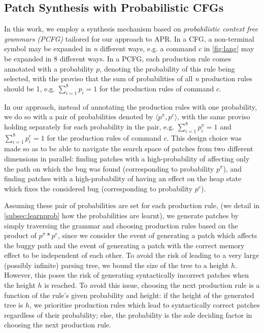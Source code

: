 \subsection{Patch Synthesis with Probabilistic CFGs}
In this work, we employ a synthesis mechanism based on \emph{probabilistic context free grammars (PCFG)} tailored for our approach to APR.
%
In a CFG, a non-terminal symbol may be expanded in \emph{n} different ways,  
e.g. a command $c$ in \autoref{fig:lang} may be expanded in 8 different ways.
In a PCFG, each production rule comes annotated with a probability $p$, denoting the probability of this rule being selected, with the proviso that 
the sum of probabilities of all  \emph{n} production rules should be 1, e.g. 
$\sum_{i=1}^8 p_i =1$ for the production rules of command $c$.

In our approach, instead of annotating the production rules with one probability, 
we do so with a pair of probabilities denoted by  $\langle p^\pi, p^e \rangle$, with the same proviso holding 
separately for each probability in the pair, e.g. $\sum_{i=1}^8 p^\pi_i =1$ and  $\sum_{i=1}^8 p^e_i =1$ for the production rules of command $c$.
This design choice was made so as to be able to navigate the search space of patches from two different dimensions in parallel: 
finding patches with a high-probability of affecting only the path on which the bug was found (corresponding to probability $p^\pi$), 
and finding patches with a high-probability of having an effect on the heap state which fixes the considered bug (corresponding to probability $p^e$). 

Assuming these pair of probabilities are set for each production rule,
(we detail in \autoref{subsec:learnprob} how the probabilities are learnt),
we generate patches by simply traversing the grammar and choosing 
production rules based on the product of $ p^\pi * p^e$, since we consider
the event of generating a patch which affects the buggy path and the event 
of generating a patch with the correct memory effect to be independent of each other.
To avoid the risk of leading to a very large (possibly infinite) parsing tree, we bound the size of the 
tree to a height $h$. 
However, this poses the risk of generating syntactically incorrect patches when 
the height $h$ is reached. To avoid this issue, choosing 
the next production rule is a function of the rule's given probability and height: 
if the height of the generated tree is $h$, we prioritise production rules which lead to syntactically correct patches regardless of their probability; else, the probability is the sole deciding factor in choosing the next production rule.  

